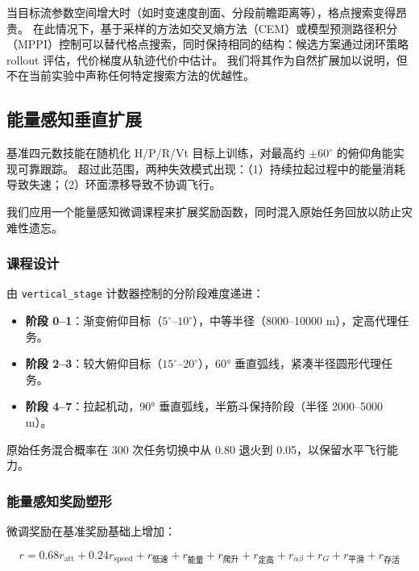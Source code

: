 \documentclass{article}
\begin{document}
当目标流参数空间增大时（如时变速度剖面、分段前瞻距离等），格点搜索变得昂贵。
在此情况下，基于采样的方法如交叉熵方法（CEM）或模型预测路径积分（MPPI）控制可以替代格点搜索，同时保持相同的结构：候选方案通过闭环策略 rollout 评估，代价梯度从轨迹代价中估计。
我们将其作为自然扩展加以说明，但不在当前实验中声称任何特定搜索方法的优越性。

\subsection{能量感知垂直扩展}

基准四元数技能在随机化 H/P/R/Vt 目标上训练，对最高约 $\pm60^\circ$ 的俯仰角能实现可靠跟踪。
超过此范围，两种失效模式出现：（1）持续拉起过程中的能量消耗导致失速；（2）环面漂移导致不协调飞行。

我们应用一个能量感知微调课程来扩展奖励函数，同时混入原始任务回放以防止灾难性遗忘。

\subsubsection{课程设计}

由 \texttt{vertical\_stage} 计数器控制的分阶段难度递进：

\begin{itemize}
  \item \textbf{阶段 0--1}：渐变俯仰目标（$5^\circ$--$10^\circ$），中等半径（8000--10000 m），定高代理任务。
  \item \textbf{阶段 2--3}：较大俯仰目标（$15^\circ$--$20^\circ$），60° 垂直弧线，紧凑半径圆形代理任务。
  \item \textbf{阶段 4--7}：拉起机动，90° 垂直弧线，半筋斗保持阶段（半径 2000--5000 m）。
\end{itemize}

原始任务混合概率在 300 次任务切换中从 0.80 退火到 0.05，以保留水平飞行能力。

\subsubsection{能量感知奖励塑形}

微调奖励在基准奖励基础上增加：

\begin{equation}
  r = 0.68 r_{\text{att}} + 0.24 r_{\text{speed}} + r_{\text{低速}} + r_{\text{能量}} + r_{\text{爬升}} + r_{\text{定高}} + r_{\alpha\beta} + r_{G} + r_{\text{平滑}} + r_{\text{存活}}
\end{equation}
\end{document}
